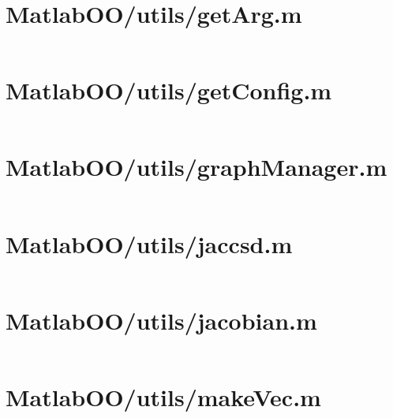 \pagebreak
\section*{MatlabOO/utils/getArg.m}\label{code:MatlabOO/utils/getArg.m}
\inputminted[linenos,fontsize=\scriptsize]{matlab}{/home/dcouture/git/mathyourlife/TSatPy/beta_versions/matlab_object_oriented/utils/getArg.m}

\pagebreak
\section*{MatlabOO/utils/getConfig.m}\label{code:MatlabOO/utils/getConfig.m}
\inputminted[linenos,fontsize=\scriptsize]{matlab}{/home/dcouture/git/mathyourlife/TSatPy/beta_versions/matlab_object_oriented/utils/getConfig.m}

\pagebreak
\section*{MatlabOO/utils/graphManager.m}\label{code:MatlabOO/utils/graphManager.m}
\inputminted[linenos,fontsize=\scriptsize]{matlab}{/home/dcouture/git/mathyourlife/TSatPy/beta_versions/matlab_object_oriented/utils/graphManager.m}

\pagebreak
\section*{MatlabOO/utils/jaccsd.m}\label{code:MatlabOO/utils/jaccsd.m}
\inputminted[linenos,fontsize=\scriptsize]{matlab}{/home/dcouture/git/mathyourlife/TSatPy/beta_versions/matlab_object_oriented/utils/jaccsd.m}

\pagebreak
\section*{MatlabOO/utils/jacobian.m}\label{code:MatlabOO/utils/jacobian.m}
\inputminted[linenos,fontsize=\scriptsize]{matlab}{/home/dcouture/git/mathyourlife/TSatPy/beta_versions/matlab_object_oriented/utils/jacobian.m}

\pagebreak
\section*{MatlabOO/utils/makeVec.m}\label{code:MatlabOO/utils/makeVec.m}
\inputminted[linenos,fontsize=\scriptsize]{matlab}{/home/dcouture/git/mathyourlife/TSatPy/beta_versions/matlab_object_oriented/utils/makeVec.m}

\pagebreak
